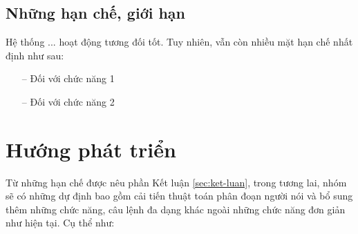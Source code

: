 \subsection{Những hạn chế, giới hạn}
Hệ thống ... hoạt động tương đối tốt. Tuy nhiên, vẫn còn nhiều mặt hạn chế nhất định như sau:
\begin{itemize}
    \item[--] Đối với chức năng 1
    \item[--] Đối với chức năng 2
\end{itemize}

\section{Hướng phát triển}

Từ những hạn chế được nêu phần Kết luận \ref{sec:ket-luan}, trong tương lai, nhóm sẽ có những dự định bao gồm cải tiến thuật toán phân đoạn người nói và bổ sung thêm những chức năng, câu lệnh đa dạng khác ngoài những chức năng đơn giản như hiện tại. Cụ thể như: